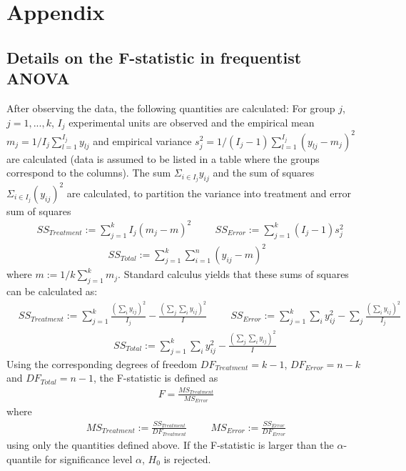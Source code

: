



\address{Riko Kelter\\
  University of Siegen, Department of Mathematics\\
  Walter-Flex-Street 3\\
  57072, Siegen\\
  Germany\\
  ORCiD: 0000-0001-9068-5696\\
  }
  
  
  \section*{Appendix}\label{appn}
  \subsection*{Details on the F-statistic in frequentist ANOVA}
  After observing the data, the following quantities are calculated: For group $j$, $j=1,...,k$, $I_j$ experimental units are observed and the empirical mean $m_j=1/I_j \sum_{l=1}^{I_j} y_{lj}$ and empirical variance $s_j^2=1/(I_j-1) \sum_{l=1}^{I_j} (y_{lj}-m_j)^2$ are calculated (data is assumed to be listed in a table where the groups correspond to the columns). The sum $\Sigma_{i\in I_j} y_{ij}$ and the sum of squares $\Sigma_{i\in I_j} (y_{ij})^2$ are calculated, to partition the variance into treatment and error sum of squares 
\begin{align}
	& SS_{Treatment}:=\sum_{j=1}^k I_j(m_j-m)^2 \hspace{1cm}
	SS_{Error}:=\sum_{j=1}^k (I_j-1)s_j^2 \\
	& \hspace{3cm} SS_{Total}:=\sum_{j=1}^k \sum_{i=1}^n (y_{ij}-m)^2
\end{align}
where $m:=1/k \sum_{j=1}^k m_j$. Standard calculus yields that these sums of squares can be calculated as:
\begin{align}
	& SS_{Treatment}:=\sum_{j=1}^k \frac{(\sum_i y_{ij})^2}{I_j}-\frac{(\sum_j \sum_i y_{ij})^2}{I} \hspace{1cm}
	SS_{Error}:=\sum_{j=1}^k \sum_{i}y_{ij}^2-\sum_{j}\frac{(\sum_i y_{ij})^2}{I_j} \\
	& \hspace{4cm} SS_{Total}:=\sum_{j=1}^k \sum_{i}y_{ij}^2-\frac{(\sum_j \sum_i y_{ij})^2}{I}
\end{align}
Using the corresponding degrees of freedom $DF_{Treatment}=k-1$, $DF_{Error}=n-k$ and $DF_{Total}=n-1$, the F-statistic is defined as
\begin{align}
	F=\frac{MS_{Treatment}}{MS_{Error}}	
\end{align}
where
\begin{align}
		MS_{Treatment}:=\frac{SS_{Treatment}}{DF_{Treatment}} \hspace{1cm} MS_{Error}:=\frac{SS_{Error}}{DF_{Error}}
\end{align}
using only the quantities defined above. If the F-statistic is larger than the $\alpha$-quantile for significance level $\alpha$, $H_0$ is rejected.
